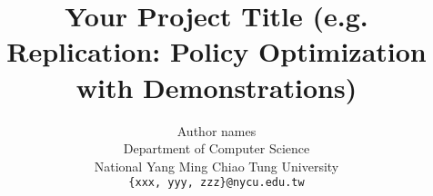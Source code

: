 \documentclass{article}
\title{Your Project Title (e.g. Replication: Policy Optimization with Demonstrations)}
\author{%
  Author names\\
  Department of Computer Science\\
  National Yang Ming Chiao Tung University\\
  \texttt{\{xxx, yyy, zzz\}@nycu.edu.tw}
}
\begin{document}
\maketitle











{
  \small
  
  
}
\end{document}
